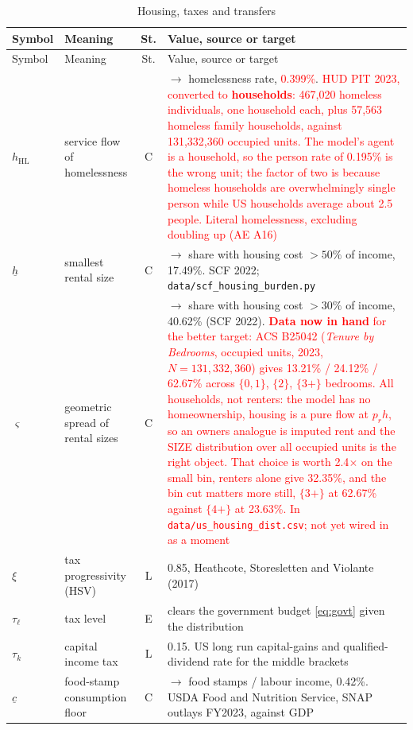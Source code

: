 \documentclass[11pt]{article}
\newcommand{\nw}[1]{\textcolor{red}{#1}}
\begin{document}
\begin{longtable}{lL{3.8cm}cL{5.8cm}}
\caption{Housing, taxes and transfers}\\
\toprule
Symbol & Meaning & St. & Value, source or target\\
\midrule
\endfirsthead
\toprule
Symbol & Meaning & St. & Value, source or target\\
\midrule
\endhead
$h_{\text{HL}}$ & service flow of homelessness & C & $\rightarrow$ homelessness rate, \nw{0.399\%}. \nw{HUD PIT 2023, converted to \textbf{households}: 467{,}020 homeless individuals, one household each, plus 57{,}563 homeless family households, against 131{,}332{,}360 occupied units. The model's agent is a household, so the person rate of 0.195\% is the wrong unit; the factor of two is because homeless households are overwhelmingly single person while US households average about 2.5 people. Literal homelessness, excluding doubling up (AE A16)}\\
$\underline h$ & smallest rental size & C & $\rightarrow$ share with housing cost $>50\%$ of income, 17.49\%. SCF 2022; \texttt{data/scf\_housing\_burden.py}\\
$\varsigma$ & geometric spread of rental sizes & C & $\rightarrow$ share with housing cost $>30\%$ of income, 40.62\% (SCF 2022). \nw{\textbf{Data now in hand} for the better target: ACS B25042 (\emph{Tenure by Bedrooms}, occupied units, 2023, $N=131{,}332{,}360$) gives 13.21\% / 24.12\% / 62.67\% across $\{0,1\}$, $\{2\}$, $\{3+\}$ bedrooms. All households, not renters: the model has no homeownership, housing is a pure flow at $p_r h$, so an owners analogue is imputed rent and the SIZE distribution over all occupied units is the right object. That choice is worth 2.4$\times$ on the small bin, renters alone give 32.35\%, and the bin cut matters more still, $\{3+\}$ at 62.67\% against $\{4+\}$ at 23.63\%. In \texttt{data/us\_housing\_dist.csv}; not yet wired in as a moment}\\
$\xi$ & tax progressivity (HSV) & L & 0.85, Heathcote, Storesletten and Violante (2017)\\
$\tau_{\ell}$ & tax level & E & clears the government budget \eqref{eq:govt} given the distribution\\
$\tau_k$ & capital income tax & L & 0.15. US long run capital-gains and qualified-dividend rate for the middle brackets\\
$\underline c$ & food-stamp consumption floor & C & $\rightarrow$ food stamps / labour income, 0.42\%. USDA Food and Nutrition Service, SNAP outlays FY2023, against GDP\\

\end{longtable}
\end{document}
